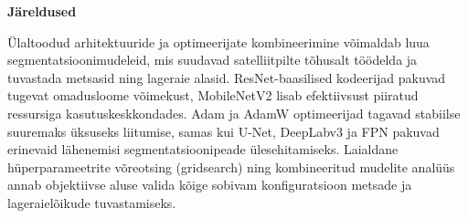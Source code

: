 \textbf{Järeldused}

Ülaltoodud arhitektuuride ja optimeerijate kombineerimine võimaldab luua segmentatsioonimudeleid, mis suudavad satelliitpilte tõhusalt töödelda ja tuvastada metsasid ning lageraie alasid. ResNet-baasilised kodeerijad pakuvad tugevat omadusloome võimekust, MobileNetV2 lisab efektiivsust piiratud ressursiga kasutuskeskkondades. Adam ja AdamW optimeerijad tagavad stabiilse suuremaks üksuseks liitumise, samas kui U-Net, DeepLabv3 ja FPN pakuvad erinevaid lähenemisi segmentatsioonipeade ülesehitamiseks. Laialdane hüperparameetrite võreotsing (gridsearch) ning kombineeritud mudelite analüüs annab objektiivse aluse valida kõige sobivam konfiguratsioon metsade ja lageraielõikude tuvastamiseks.

